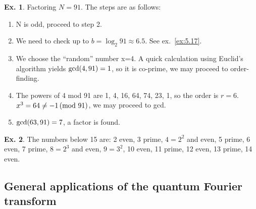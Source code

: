 \documentclass[a4paper,12pt]{article}
\theoremstyle{definition}
\newtheorem{exercise}{Ex.}[section]
\begin{document}
\begin{exercise}
 Factoring $N=91$. The steps are as follows:
 \begin{enumerate}
  \item N is odd, proceed to step 2.
  \item We need to check up to $b=\log_2 91\approx 6.5$. See ex.~\ref{ex:5.17}.
  \item We choose the ``random'' number x=4. A quick calculation using Euclid's algorithm yields ${\rm gcd}(4, 91)=1$, so it is co-prime, we may proceed to order-finding.
  \item The powers of 4 mod 91 are 1, 4, 16, 64, 74, 23, 1, so the order is $r=6$. $x^3=64\ne -1\,({\rm mod\ }91)$, we may proceed to gcd.
  \item ${\rm gcd}(63, 91)=7$, a factor is found.
 \end{enumerate}
\end{exercise}

\begin{exercise}
 The numbers below 15 are: 2 even, 3 prime, $4=2^2$ and even, 5 prime, 6 even, 7 prime, $8=2^3$ and even, $9=3^2$, 10 even, 11 prime, 12 even, 13 prime, 14 even.
\end{exercise}

\subsection{General applications of the quantum Fourier transform}\label{ssec:generalApplicationsQFT}
\end{document}
